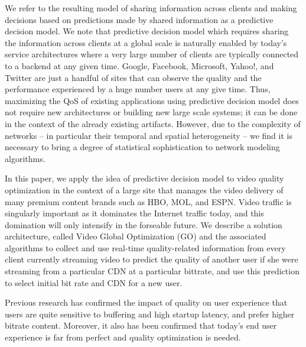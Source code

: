 We refer to the resulting model of sharing information across clients and making decisions based on predictions made by shared information as a predictive decision model. We note that predictive decision model which requires sharing the information across clients at a global scale is naturally enabled by today's service architectures where a very large number of clients are typically connected to a backend at any given time. Google, Facebook, Microsoft, Yahoo!, and Twitter are just a handful of sites that can observe the quality and the performance experienced by a huge number users at any give time. Thus, maximizing the QoS of existing applications using predictive decision model does not require new architectures or building new large scale systems; it can be done in the context of the already existing artifacts.  However, due to the complexity of networks -- in particular their temporal and spatial heterogeneity -- we find it is necessary to bring a degree of statistical sophistication to network modeling algorithms.

In this paper, we apply the idea of predictive decision model to video quality optimization in the context of a large site that manages the video delivery of many premium content brands such as HBO, MOL, and ESPN. Video traffic is singularly important as it dominates the Internet traffic today, and this domination will only intensify in the forseable future. We describe a solution architecture, called Video Global Optimization (GO) and the associated algorithms to collect and use real-time quality-related information from every client currently streaming video to predict the quality of another user if she were streaming from a particular CDN at a particular bittrate, and use this prediction to select initial bit rate and CDN for a new user.




 Previous research has confirmed the impact of quality on user experience that users are quite sensitive to buffering and high startup latency, and prefer higher bitrate content. Moreover, it also has been confirmed that today's end user experience is far from perfect and quality optimization is needed\cite{sigcomm12,conext13}.

